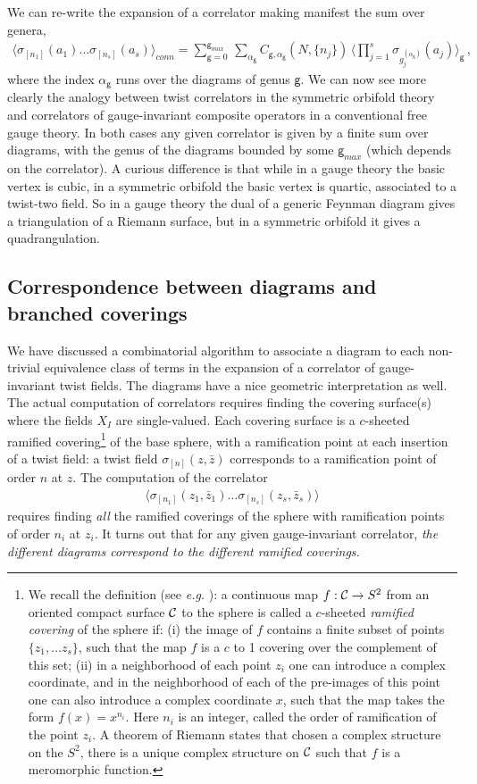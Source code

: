 \documentclass[letterpaper]{JHEP3}
\def\s{\sigma}
\def\a{\alpha}
\def\be{\begin{equation}}
\def\ee{\end{equation}}
\def\a{\alpha}
\def\be{\begin{eqnarray}}
\def\ee{\end{eqnarray}}
\def\gg{\mathsf g }
\begin{document}
We can re-write the expansion of a correlator making manifest the sum over genera,
\be\label{pertexp2}
\langle \s_{[n_1]} (a_1)  \dots \s_{[n_s]} (a_s) \rangle_{conn} =
\sum_{\gg=0}^{\gg_{max}}\, \sum_{\a_\gg} C_{\gg,\a_\gg}(N,\{n_j\})\,\langle\prod_{j=1}^s\s_{g_j^{(\a_\gg)}}(a_j)\rangle_{\gg} \, ,
\ee 
where the index $ \a_\gg$ runs over the diagrams of genus $\gg$. We can now see more clearly the analogy
between twist correlators in the symmetric orbifold theory and correlators of gauge-invariant composite operators
in a conventional free gauge theory. In both cases any given correlator is given by a finite 
sum over diagrams,  with  the genus of the diagrams bounded by some
$\gg_{max}$ (which depends on the correlator). 
A curious difference is that  while in a gauge theory the basic vertex is cubic,
   in a symmetric orbifold the basic vertex is  quartic, associated to a twist-two field.
 So in a gauge theory  the dual
  of  a generic Feynman diagram gives a triangulation of a Riemann surface,
  but in a symmetric orbifold it gives a quadrangulation.




\subsection{Correspondence between diagrams and branched coverings}

We have discussed a combinatorial algorithm to associate a diagram to each non-trivial equivalence class of terms
 in the expansion of a correlator of gauge-invariant twist fields.  The diagrams have a nice geometric interpretation as well.
The actual computation of correlators  requires finding the covering surface(s) where the fields  $X_I$ are single-valued.
Each covering surface is a $c$-sheeted ramified covering\footnote{We recall the definition (see {\it e.g.} \cite{Lando2}): 
a continuous map $f: {\cal C} \to S^2$ from an oriented compact surface ${\cal C}$ to the sphere
is called a $c$-sheeted {\it ramified covering} of the sphere 
if: (i) the image of $f$ contains a finite
subset of points $\{ z_1, \dots z_s \}$, such that the map $f$ is a $c$ to 1 covering over the complement of this set; (ii) in a neighborhood
of each point $z_i$ one can introduce a complex coordinate, and in the neighborhood of each of the pre-images of this point
one can also introduce a complex coordinate $x$, such that the map takes the form $f(x) = x^{n_i}$. Here $n_i$ is an integer, called
the order of ramification of the point $z_i$.  A theorem of Riemann states that chosen
a complex structure on the $S^2$, there is a unique complex structure
on ${\cal C}$ such that $f$ is a meromorphic function.}
of the base sphere, with a ramification point at
 each insertion of a twist field: a twist field $\sigma_{[n]} (z, \bar z)$ corresponds to a ramification point
of order $n$ at $z$.  The computation of the correlator 
\be \label{corragain}
\langle \sigma_{[n_1]} (z_1, \bar z_1) \dots   \sigma_{[n_s]}(z_s, \bar z_s) \rangle
\ee
requires finding {\it all} the ramified coverings of the sphere  with 
ramification points of order $n_i$ at $z_i$. It turns out that for any given gauge-invariant correlator,
{\it the  different diagrams   correspond to the different ramified coverings.}
\end{document}
